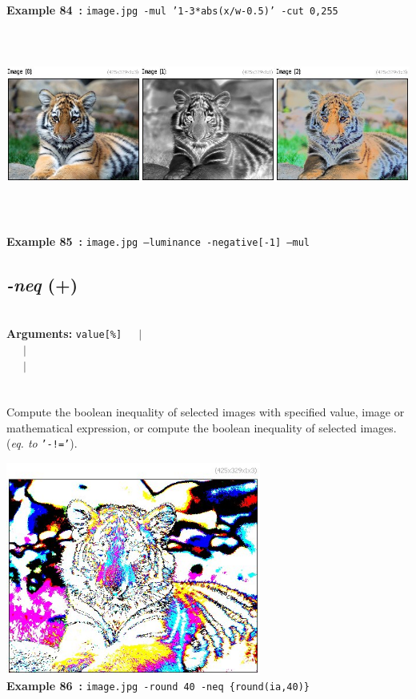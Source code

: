\documentclass[a4paper,11pt,twoside]{book}
\begin{document}
\begin{center}
{\footnotesize \textbf{Example 84~:} \texttt{image.jpg -mul '1-3*abs(x/w-0.5)' -cut 0,255}}
\\\includegraphics[keepaspectratio=true,height=7cm,width=\textwidth]{img/gmic_def85.jpg}\\
{\footnotesize \textbf{Example 85~:} \texttt{image.jpg --luminance -negative[-1] --mul}}
\end{center}

\subsection{\emph{-neq} (+)}\vspace*{-0.5em}
~\\\textbf{Arguments: } 
{\small \texttt{value[\%]}}~~~$|$\\
\hspace*{2.2cm}{\small \texttt{[image]}}~~~$|$\\
~~~$|$\\
\\~\\
Compute the boolean inequality of selected images with specified value, image or
mathematical expression, or compute the boolean inequality of selected images.
~\\(\emph{eq. to} {\small \texttt{'-!='}}).
\begin{center}\includegraphics[keepaspectratio=true,height=7cm,width=\textwidth]{img/gmic_def86.jpg}\\
{\footnotesize \textbf{Example 86~:} \texttt{image.jpg -round 40 -neq \{round(ia,40)\}}}
\end{center}
\end{document}
